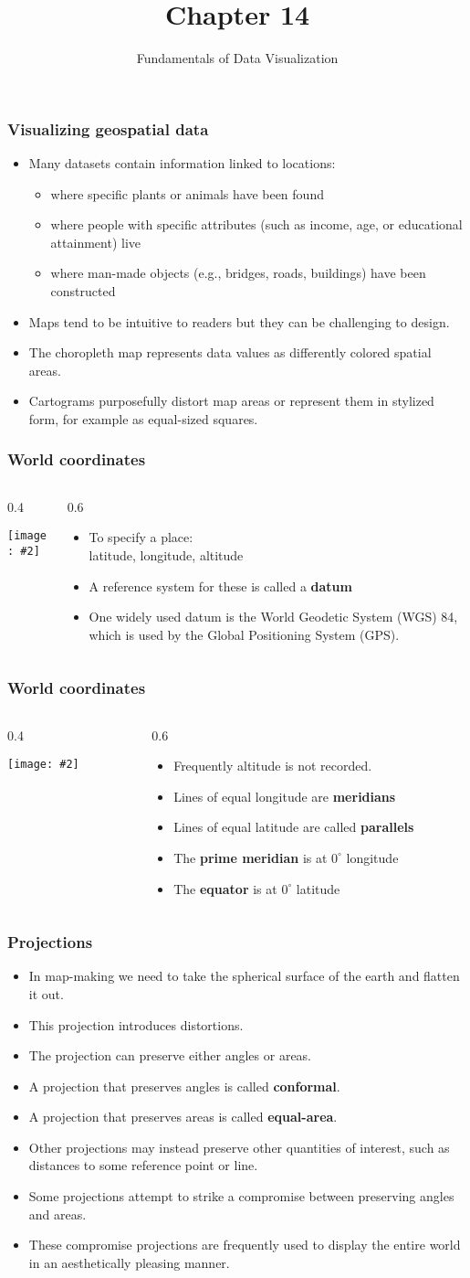 \documentclass{beamer}
\author{Fundamentals of Data Visualization}
\title{Chapter 14}
\newcommand{\bi}{\begin{itemize}}
\newcommand{\li}{\item}
\newcommand{\ei}{\end{itemize}}
\newcommand{\fig}[2]{\centerline{\texttt{[image: \#2]}}}
\newcommand{\bfr}[1]{\begin{frame}[fragile]\frametitle{{ #1 }}}
\newcommand{\cola}[1]{\begin{columns}\begin{column}{#1\textwidth}}
\newcommand{\colb}[1]{\end{column}\begin{column}{#1\textwidth}}
\newcommand{\colc}{\end{column}\end{columns}}
\begin{document}
\begin{frame}
\maketitle
\end{frame}

\bfr{Visualizing geospatial data}
\bi
\li Many datasets contain information linked to locations:
\bi
\li where specific plants or animals have been found 
\li  where people with specific attributes (such as income, age, or educational attainment) live
\li where man-made objects (e.g., bridges, roads, buildings) have been constructed 
\ei
\li
Maps tend to be intuitive to readers but they can be challenging to design. 
\li The choropleth map represents data values as differently colored spatial areas.
\li  Cartograms purposefully distort map areas or represent them in stylized form, for example as equal-sized squares.
\ei
\end{frame}

\bfr{World coordinates}
\cola{0.4}
\fig{1.5}{world-orthographic-1.png}
\colb{0.6}
\bi
\li To specify a place:\\ latitude, longitude, altitude
\li A reference system for these is called a {\bf datum}
\li One widely used datum is the World Geodetic System (WGS) 84, which is used by the Global Positioning System (GPS).
\ei
\colc
\end{frame}

\bfr{World coordinates}
\cola{0.4}
\fig{1.5}{world-orthographic-1.png}
\colb{0.6}
\bi
\li Frequently altitude is not recorded.
\li Lines of equal longitude are {\bf meridians}
\li Lines of equal latitude are called {\bf parallels}
\li The {\bf prime meridian} is at $0^\circ$ longitude
\li The {\bf equator} is at $0^\circ$ latitude
\ei
\colc
\end{frame}

\bfr{Projections}
\bi
\li In map-making we need to take the spherical surface of the earth and flatten it out.
\li This  projection  introduces distortions.
\li The projection can preserve either angles or areas. 
\li A projection that preserves angles is called {\bf conformal}.
\li A projection that preserves areas is called {\bf equal-area}.
\li  Other projections may  instead preserve other quantities of interest, such as distances to some reference point or line. 
\li Some projections attempt to strike a compromise between preserving angles and areas.
\li These compromise projections are frequently used to display the entire world in an aesthetically pleasing manner.
\ei
\end{frame}
\end{document}
